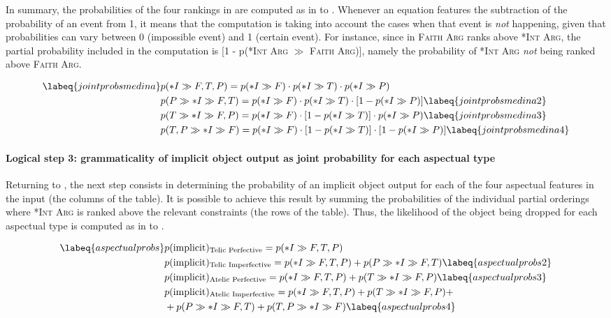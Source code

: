 In summary, the probabilities of the four rankings in  are computed as in  to . Whenever an equation features the subtraction of the probability of an event from 1, it means that the computation is taking into account the cases when that event is \textit{not} happening, given that probabilities can vary between 0 (impossible event) and 1 (certain event). For instance, since in  \textsc{Faith Arg} ranks above \textsc{*Int Arg}, the partial probability included in the computation is [1 - p(\textsc{*Int Arg} $\gg$ \textsc{Faith Arg})], namely the probability of \textsc{*Int Arg} \textit{not} being ranked above \textsc{Faith Arg}.

\begin{align}  \labeq{jointprobsmedina} %
    & p(*I \gg {F, T, P}) = p(*I \gg F) \cdot p(*I \gg T) \cdot p(*I \gg P) \\
    & p(P \gg *I \gg {F, T}) = p(*I \gg F) \cdot p(*I \gg T) \cdot [1 - p(*I \gg P)] \labeq{jointprobsmedina2}\\
    & p(T \gg *I \gg {F, P}) = p(*I \gg F) \cdot [1 - p(*I \gg T)] \cdot p(*I \gg P) \labeq{jointprobsmedina3}\\
    & p({T, P} \gg *I \gg F) = p(*I \gg F) \cdot [1 - p(*I \gg T)] \cdot [1 - p(*I \gg P)] \labeq{jointprobsmedina4}
\end{align}

\paragraph{Logical step 3: grammaticality of implicit object output as joint probability for each aspectual type} Returning to , the next step consists in determining the probability of an implicit object output for each of the four aspectual features in the input (the columns of the table). It is possible to achieve this result by summing the probabilities of the individual partial orderings where \textsc{*Int Arg} is ranked above the relevant constraints (the rows of the table). Thus, the likelihood of the object being dropped for each aspectual type is computed as in  to .

\begin{align}  \labeq{aspectualprobs}
    & p(\text{implicit})\textsubscript{Telic Perfective} = p(*I \gg {F, T, P}) \\
    & p(\text{implicit})\textsubscript{Telic Imperfective} = p(*I \gg {F, T, P}) + p(P \gg *I \gg {F, T}) \labeq{aspectualprobs2}\\
    & p(\text{implicit})\textsubscript{Atelic Perfective} = p(*I \gg {F, T, P}) + p(T \gg *I \gg {F, P}) \labeq{aspectualprobs3}\\
    & p(\text{implicit})\textsubscript{Atelic Imperfective} = p(*I \gg {F, T, P}) + p(T \gg *I \gg {F, P}) + \nonumber \\ & + p(P \gg *I \gg {F, T}) + p({T, P} \gg *I \gg F) \labeq{aspectualprobs4}
\end{align}

